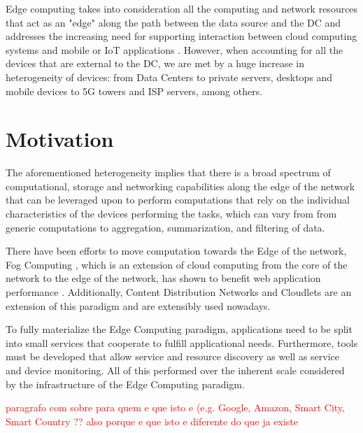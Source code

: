 Edge computing takes into consideration all the computing and network resources that act as an "edge" along the path between the data source and the DC and addresses the increasing need for supporting interaction between cloud computing systems and mobile or IoT applications \cite{iot_journal_shi_weisong_and_cao}. However, when accounting for all the devices that are external to the DC, we are met by a huge increase in heterogeneity of devices: from Data Centers to private servers, desktops and mobile devices to 5G towers and ISP servers, among others. 

\section{Motivation}

The aforementioned heterogeneity implies that there is a broad spectrum of
computational, storage and networking capabilities along the edge of the network that can be leveraged upon to perform computations that rely on the individual characteristics of the devices performing the tasks, which can vary from from generic computations to aggregation, summarization, and filtering of data. \cite{DBLP:journals/corr/abs-1805-06989} %


There have been efforts to move computation towards the Edge of the network, Fog Computing \cite{yi2015fog}, which is an extension of cloud computing from the core of the network to the edge of the network, has shown to benefit web application performance \cite{Improving_Web_Sites_Performance_Using_Edge_Servers_in_Fog_Computing_Architecture}. Additionally, Content Distribution Networks \cite{} and Cloudlets \cite{} 
are an extension of this paradigm and are extensibly used nowadays. %

To fully materialize the Edge Computing paradigm, applications need to be split into small services that cooperate to fulfill applicational needs. 
Furthermore, tools must be developed that allow service and resource discovery as well as service and device monitoring. All of this performed over the inherent scale considered by the infrastructure of the Edge Computing paradigm.

\textcolor{red}{paragrafo com sobre para quem e que isto e (e.g. Google, Amazon, Smart City, Smart Country ?? also porque e que isto e diferente do que ja existe}

